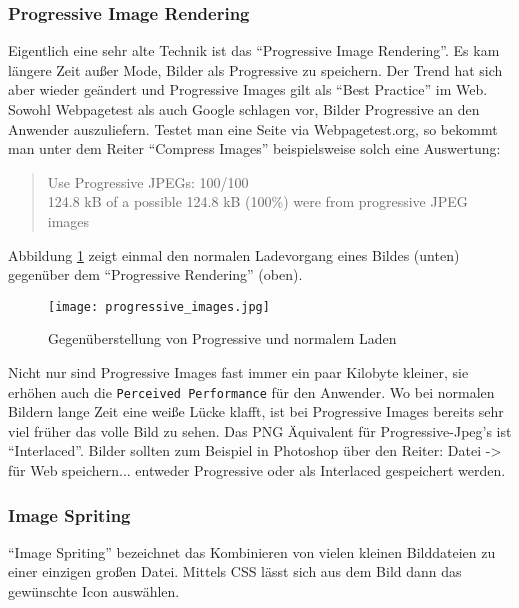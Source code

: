 		\subsubsection{Progressive Image Rendering} %
		\label{ssub:progressive_image_rendering}
			Eigentlich eine sehr alte Technik ist das "`Progressive Image Rendering"'. Es kam längere Zeit außer Mode, Bilder als Progressive zu speichern. Der Trend hat sich aber wieder geändert und Progressive Images gilt als "`Best Practice"' im Web. Sowohl Webpagetest als auch Google schlagen vor, Bilder Progressive an den Anwender auszuliefern. Testet man eine Seite via Webpagetest.org, so bekommt man unter dem Reiter "`Compress Images"' beispielsweise solch eine Auswertung:
			\begin{quote}
				Use Progressive JPEGs: 100/100\\
				124.8 kB of a possible 124.8 kB (100\%) were from progressive JPEG images
			\end{quote}

			Abbildung \ref{fig:progressive_images} zeigt einmal den normalen Ladevorgang eines Bildes (unten) gegenüber dem "`Progressive Rendering"' (oben).

			\begin{figure}[htbp]
				\begin{center}
					\texttt{[image: progressive\_images.jpg]}
					\caption{Gegenüberstellung von Progressive und normalem Laden}
					\label{fig:progressive_images}
				\end{center}
			\end{figure}

			Nicht nur sind Progressive Images fast immer ein paar Kilobyte kleiner, sie erhöhen auch die \texttt{Perceived Performance} für den Anwender. Wo bei normalen Bildern lange Zeit eine weiße Lücke klafft, ist bei Progressive Images bereits sehr viel früher das volle Bild zu sehen. Das PNG Äquivalent für Progressive-Jpeg's ist "`Interlaced"'. Bilder sollten zum Beispiel in Photoshop über den Reiter: Datei -> für Web speichern... entweder Progressive oder als Interlaced gespeichert werden.

		\subsubsection{Image Spriting} %
		\label{ssub:image_spriting}
			"`Image Spriting"' bezeichnet das Kombinieren von vielen kleinen Bilddateien zu einer einzigen großen Datei. Mittels CSS lässt sich aus dem Bild dann das gewünschte Icon auswählen.

